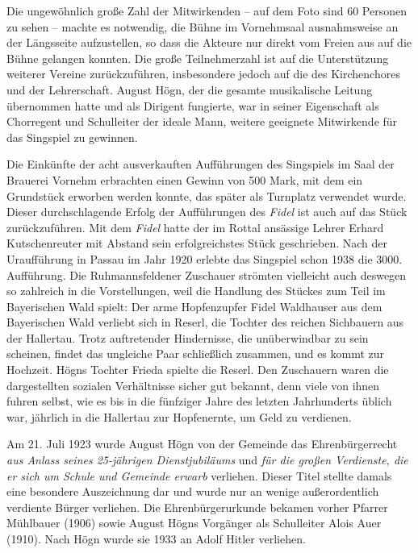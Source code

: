 \documentclass{book}
\newcommand{\zitat}[1]{\textit{#1}}
\begin{document}
Die ungewöhnlich große Zahl der Mitwirkenden – auf dem Foto sind 60
Personen zu sehen – machte es notwendig, die Bühne im Vornehmsaal
aus\-nahmsweise an der Längsseite aufzustellen, so dass die Akteure nur
direkt vom Freien aus auf die Bühne gelangen konnten. Die große
Teilnehmerzahl ist auf die Unterstützung weiterer Vereine
zurückzuführen, insbesondere je\-doch auf die des Kirchenchores und der
Lehrerschaft. August Högn, der die gesamte musikalische Leitung
übernommen hatte und als Dirigent fungierte, war in seiner Eigenschaft
als Chorregent und Schulleiter der ideale Mann, weitere geeignete
Mitwirkende für das Singspiel zu gewinnen.

 

Die Einkünfte der acht ausverkauften Aufführungen des Singspiels im Saal
der Brauerei Vornehm erbrachten einen Gewinn von 500 Mark, mit dem ein
Grundstück erworben werden konnte, das später als Turnplatz verwendet
wurde. Dieser durchschlagende Erfolg der Aufführungen des
\textit{Fidel} ist auch auf das Stück zurückzuführen. Mit dem
\textit{Fidel} hatte der im Rottal ansässige Lehrer Erhard
Kutschenreuter mit Abstand sein erfolgreichstes Stück geschrieben. Nach
der Uraufführung in Passau im Jahr 1920 erlebte das Singspiel schon
1938 die 3000. Aufführung. Die Ruhmannsfeldener Zuschauer strömten
viel\-leicht auch deswegen so zahlreich in die Vorstellungen, weil die
Handlung des Stückes zum Teil im Bayerischen Wald spielt: Der arme
Hopfenzupfer Fidel Waldhauser aus dem Bayerischen Wald verliebt sich in
Reserl, die Tochter des reichen Sichbauern aus der Hallertau. Trotz
auftretender Hindernisse, die un\-überwindbar zu sein scheinen, findet
das ungleiche Paar schließlich zusam\-men, und es kommt zur Hochzeit.
Högns Tochter Frieda spielte die Reserl. Den Zuschauern waren die
dargestellten sozialen Verhältnisse sicher gut bekannt, denn viele von
ihnen fuhren selbst, wie es bis in die fünfziger Jahre des letzten
Jahrhunderts üblich war, jährlich in die Hallertau zur Hopfenernte, um
Geld zu verdienen.

Am 21. Juli 1923 wurde August Högn von der Gemeinde das
Ehrenbür\-gerrecht \zitat{aus Anlass seines 25-jährigen
Dienstjubiläums} und \zitat{für die großen Verdienste, die er
sich um Schule und Gemeinde erwarb} verliehen. Dieser Titel stellte
damals eine besondere Auszeichnung dar und wurde nur an wenige
außerordentlich verdiente Bürger verliehen. Die Ehrenbürgerurkunde
bekamen vorher Pfarrer Mühlbauer (1906) sowie August Högns Vorgänger
als Schulleiter Alois Auer (1910). Nach Högn wurde sie 1933 an Adolf
Hitler verliehen.
\end{document}
